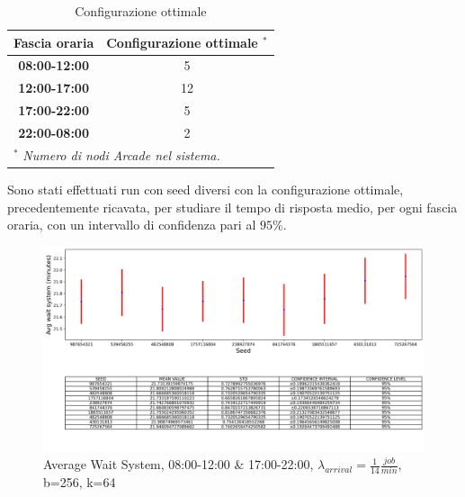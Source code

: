 \documentclass{article}
\begin{document}
\begin{table}[htbp]
\caption{Configurazione ottimale}
\begin{center}
\begin{tabular}{|c|c|}
\hline
\textbf{Fascia oraria} & \textbf{Configurazione ottimale $^{\mathrm{*}}$} \\ \hline
\textbf{08:00-12:00}  & 5 \\ \hline
\textbf{12:00-17:00}  & 12 \\ \hline
\textbf{17:00-22:00}  & 5 \\ \hline
\textbf{22:00-08:00} & 2 \\ \hline
\multicolumn{2}{l}{$^{\mathrm{*}}$ \textit{Numero di nodi Arcade nel sistema.}}
\end{tabular}
\label{tab3}
\end{center}
\end{table}
Sono stati effettuati run con seed diversi con la configurazione ottimale, precedentemente ricavata, per studiare il tempo di risposta medio, per ogni fascia oraria, con un intervallo di confidenza pari al $95\%$.

\begin{figure}[H]
	\centering
	\captionsetup{justification=centering,margin=2cm}
	\includegraphics[scale=0.48]{images/avg_ws_steady_state_mor.png}
	\caption{Average Wait System, 08:00-12:00 \& 17:00-22:00, $\lambda_{arrival}=\frac{1}{14} \frac{job}{min}$, b=256, k=64}\label{figura:avg_ws_steady_state_mor}
\end{figure}
\end{document}
